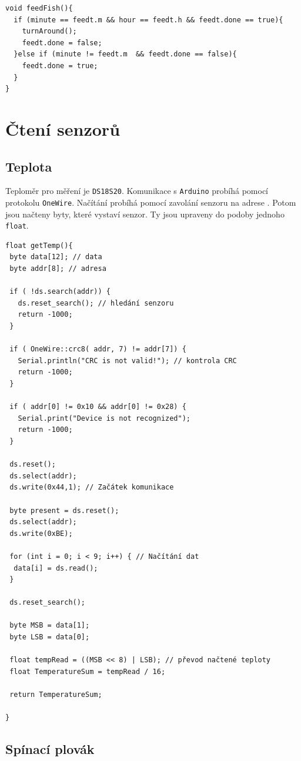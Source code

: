 \documentclass[a4paper,10pt]{article}
\newcommand{\ttt}[1]{\texttt{#1}}
\begin{document}
\begin{verbatim}
void feedFish(){
  if (minute == feedt.m && hour == feedt.h && feedt.done == true){
    turnAround();
    feedt.done = false;
  }else if (minute != feedt.m  && feedt.done == false){
    feedt.done = true;
  }
}
\end{verbatim}

\section{Čtení senzorů}

\subsection{Teplota}

Teploměr pro měření je \ttt{DS18S20}. Komunikace s \ttt{Arduino} probíhá pomocí protokolu \ttt{OneWire}. Načítání probíhá pomocí zavolání senzoru na adrese \cite{dscd}. Potom jsou načteny byty, které vystaví senzor. Ty jsou upraveny do podoby jednoho \ttt{float}.

\begin{verbatim}
float getTemp(){
 byte data[12]; // data
 byte addr[8]; // adresa 

 if ( !ds.search(addr)) {
   ds.reset_search(); // hledání senzoru
   return -1000;
 }

 if ( OneWire::crc8( addr, 7) != addr[7]) {
   Serial.println("CRC is not valid!"); // kontrola CRC
   return -1000;
 }

 if ( addr[0] != 0x10 && addr[0] != 0x28) {
   Serial.print("Device is not recognized");
   return -1000;
 }

 ds.reset();
 ds.select(addr);
 ds.write(0x44,1); // Začátek komunikace

 byte present = ds.reset();
 ds.select(addr);  
 ds.write(0xBE);

 for (int i = 0; i < 9; i++) { // Načítání dat
  data[i] = ds.read();
 }
 
 ds.reset_search();
 
 byte MSB = data[1];
 byte LSB = data[0];

 float tempRead = ((MSB << 8) | LSB); // převod načtené teploty
 float TemperatureSum = tempRead / 16;
 
 return TemperatureSum;
 
}
\end{verbatim}

\subsection{Spínací plovák}
\end{document}
